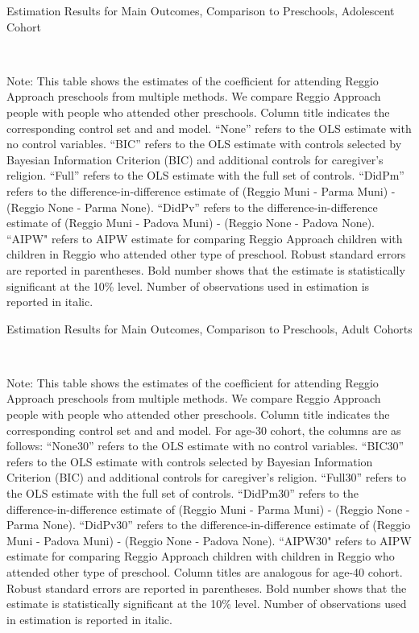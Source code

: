 \begin{landscape}
\begin{table}[H] \caption{Estimation Results for Main Outcomes, Comparison to Preschools, Adolescent Cohort} \label{ols-M-adol-reg-pres}
\scalebox{0.8}{}
\vspace{1ex} \\
\footnotesize\raggedright{Note: This table shows the estimates of the coefficient for attending Reggio Approach preschools from multiple methods. We compare Reggio Approach people with people who attended other preschools. Column title indicates the corresponding control set and and model. ``None'' refers to the OLS estimate with no control variables. ``BIC'' refers to the OLS estimate with controls selected by Bayesian Information Criterion (BIC) and additional controls for caregiver's religion. ``Full'' refers to the OLS estimate with the full set of controls. ``DidPm'' refers to the difference-in-difference estimate of (Reggio Muni - Parma Muni) - (Reggio None - Parma None). ``DidPv'' refers to the difference-in-difference estimate of (Reggio Muni - Padova Muni) - (Reggio None - Padova None). ``AIPW" refers to AIPW estimate for comparing Reggio Approach children with children in Reggio who attended other type of preschool. Robust standard errors are reported in parentheses. Bold number shows that the estimate is statistically significant at the 10\% level. Number of observations used in estimation is reported in italic.}
\end{table}




\begin{table}[H] \caption{Estimation Results for Main Outcomes, Comparison to Preschools, Adult Cohorts} \label{ols-M-adult-reg-pres}
\scalebox{0.75}{}
\vspace{1ex} \\
\footnotesize\raggedright{Note: This table shows the estimates of the coefficient for attending Reggio Approach preschools from multiple methods. We compare Reggio Approach people with people who attended other preschools.  Column title indicates the corresponding control set and and model. For age-30 cohort, the columns are as follows: ``None30'' refers to the OLS estimate with no control variables. ``BIC30'' refers to the OLS estimate with controls selected by Bayesian Information Criterion (BIC) and additional controls for caregiver's religion. ``Full30'' refers to the OLS estimate with the full set of controls. ``DidPm30'' refers to the difference-in-difference estimate of (Reggio Muni - Parma Muni) - (Reggio None - Parma None). ``DidPv30'' refers to the difference-in-difference estimate of (Reggio Muni - Padova Muni) - (Reggio None - Padova None).  ``AIPW30" refers to AIPW estimate for comparing Reggio Approach children with children in Reggio who attended other type of preschool. Column titles are analogous for age-40 cohort. Robust standard errors are reported in parentheses. Bold number shows that the estimate is statistically significant at the 10\% level. Number of observations used in estimation is reported in italic.}
\end{table}


\end{landscape}
